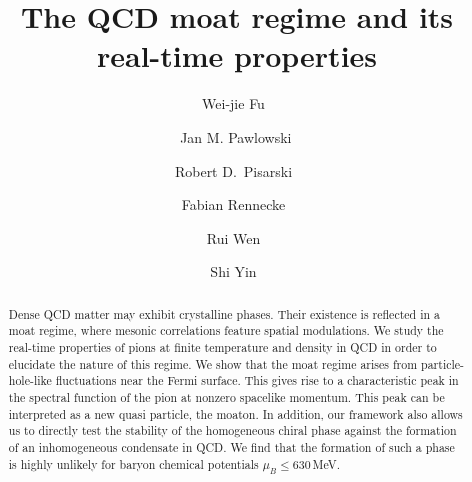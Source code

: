 \documentclass[reprint,english,superscriptaddress,preprintnumbers,amsmath,amssymb,aps,prd,nofootinbib]{revtex4-2}
\newcommand{\gettitle}{The QCD moat regime and its real-time properties}
\begin{document}
\title{\gettitle}

\author{Wei-jie Fu \,}
  
\author{Jan M. Pawlowski\,}

\author{Robert D.\ Pisarski \,}

\author{Fabian Rennecke \,}

\author{Rui Wen \,}

\author{Shi Yin \,}

	
	
\begin{abstract}
Dense QCD matter may exhibit crystalline phases. Their existence is reflected in a moat regime, where mesonic correlations feature spatial modulations. We study the real-time properties of pions at finite temperature and density in QCD in order to elucidate the nature of this regime. We show that the moat regime arises from particle-hole-like fluctuations near the Fermi surface. This gives rise to a characteristic peak in the spectral function of the pion at nonzero spacelike momentum. This peak can be interpreted as a new quasi particle, the moaton. In addition, our framework also allows us to directly test the stability of the homogeneous chiral phase against the formation of an inhomogeneous condensate in QCD. We find that the formation of such a phase is highly unlikely for baryon chemical potentials $\mu_B \leq 630$\,MeV.    
\end{abstract}
\end{document}
